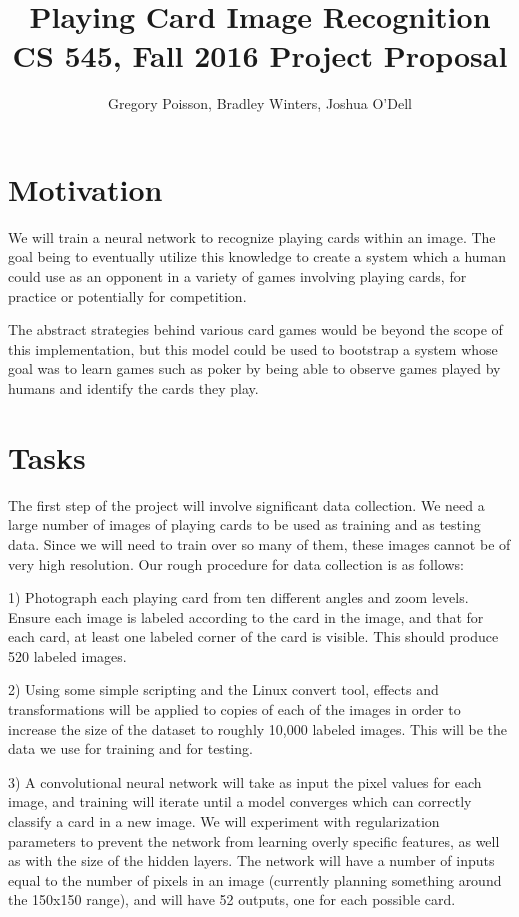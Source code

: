 \documentclass{article}
\begin{document}
\title{ Playing Card Image Recognition\\[1ex] \footnotesize\mdseries CS 545, Fall 2016 Project Proposal }
\author{Gregory Poisson, Bradley Winters, Joshua O'Dell}
\maketitle

\noindent\hrulefill
\vspace{-5mm} %

\section{Motivation}
We will train a neural network to recognize playing cards within an image.  The goal being to eventually utilize this knowledge to create a system which a human could use as an opponent in a variety of games involving playing cards, for practice or potentially for competition.

The abstract strategies behind various card games would be beyond the scope of this implementation, but this model could be used to bootstrap a system whose goal was to learn games such as poker by being able to observe games played by humans and identify the cards they play.

\section{Tasks}
The first step of the project will involve significant data collection. We need a large number of images of playing cards to be used as training and as testing data. Since we will need to train over so many of them, these images cannot be of very high resolution. Our rough procedure for data collection is as follows: 

1) Photograph each playing card from ten different angles and zoom levels. Ensure each image is labeled according to the card in the image, and that for each card, at least one labeled corner of the card is visible. This should produce 520 labeled images. 

2) Using some simple scripting and the Linux convert tool, effects and transformations will be applied to copies of each of the images in order to increase the size of the dataset to roughly 10,000 labeled images. This will be the data we use for training and for testing. 

3) A convolutional neural network \cite{conv} will take as input the pixel values for each image, and training will iterate until a model converges which can correctly classify a card in a new image. We will experiment with regularization parameters to prevent the network from learning overly specific features, as well as with the size of the hidden layers. The network will have a number of inputs equal to the number of pixels in an image (currently planning something around the 150x150 range), and will have 52 outputs, one for each possible card.
\end{document}

